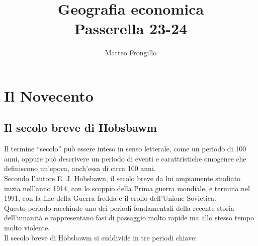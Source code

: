 \documentclass{article}
\title{\textbf{Geografia economica\\Passerella 23-24}}
\author{Matteo Frongillo}
\begin{document}
\maketitle
\tableofcontents
\pagebreak

\section{Il Novecento}
\subsection{Il secolo breve di Hobsbawm}

Il termine ``secolo'' può essere inteso in senso letterale, come un periodo di 100 anni, oppure può
descrivere un periodo di eventi e carattristiche omogenee che definiscono un'epoca, anch'essa
di circa 100 anni.\\
Secondo l'autore E. J. Hobsbawn, il secolo breve da lui ampiamente studiato inizia nell'anno
1914, con lo scoppio della Prima guerra mondiale, e termina nel 1991, con la fine della
Guerra fredda e il crollo dell'Unione Sovietica.\\
Questo periodo racchiude uno dei periodi fondamentali della recente storia dell'umanità e 
rappresentano fasi di passaggio molto rapide ma allo stesso tempo molto violente.\\
Il secolo breve di Hobsbawm si suddivide in tre periodi chiave:
\end{document}
